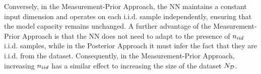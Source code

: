 {%
Conversely, in the Measurement-Prior Approach, the NN maintains a constant input dimension and operates on each i.i.d. sample independently, ensuring that the model capacity remains unchanged. A further advantage of the Measurement-Prior Approach is that the NN does not need to adapt to the presence of $n_{iid}$ i.i.d. samples, while in the Posterior Approach it must infer {the fact that they are i.i.d.} from the dataset. Consequently, in the Measurement-Prior Approach, increasing $n_{iid}$ has a similar effect to increasing the size of the dataset $N_{\mathcal{D}}$.

}

